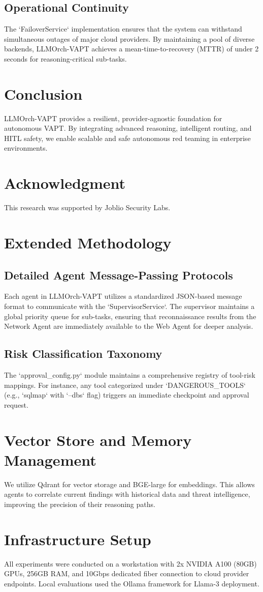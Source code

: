\documentclass[conference,compsoc]{IEEEtran}
\begin{document}
\subsection{Operational Continuity}
The `FailoverService` implementation ensures that the system can withstand simultaneous outages of major cloud providers. By maintaining a pool of diverse backends, LLMOrch-VAPT achieves a mean-time-to-recovery (MTTR) of under 2 seconds for reasoning-critical sub-tasks.

\section{Conclusion}
LLMOrch-VAPT provides a resilient, provider-agnostic foundation for autonomous VAPT. By integrating advanced reasoning, intelligent routing, and HITL safety, we enable scalable and safe autonomous red teaming in enterprise environments.

\section*{Acknowledgment}
This research was supported by Joblio Security Labs.




\appendix
\section{Extended Methodology}
\subsection{Detailed Agent Message-Passing Protocols}
Each agent in LLMOrch-VAPT utilizes a standardized JSON-based message format to communicate with the `SupervisorService`. The supervisor maintains a global priority queue for sub-tasks, ensuring that reconnaissance results from the Network Agent are immediately available to the Web Agent for deeper analysis.

\subsection{Risk Classification Taxonomy}
The `approval\_config.py` module maintains a comprehensive registry of tool-risk mappings. For instance, any tool categorized under `DANGEROUS\_TOOLS` (e.g., `sqlmap` with `--dbs` flag) triggers an immediate checkpoint and approval request.

\section{Vector Store and Memory Management}
We utilize Qdrant for vector storage and BGE-large for embeddings. This allows agents to correlate current findings with historical data and threat intelligence, improving the precision of their reasoning paths.

\section{Infrastructure Setup}
All experiments were conducted on a workstation with 2x NVIDIA A100 (80GB) GPUs, 256GB RAM, and 10Gbps dedicated fiber connection to cloud provider endpoints. Local evaluations used the Ollama framework for Llama-3 deployment.
\end{document}
